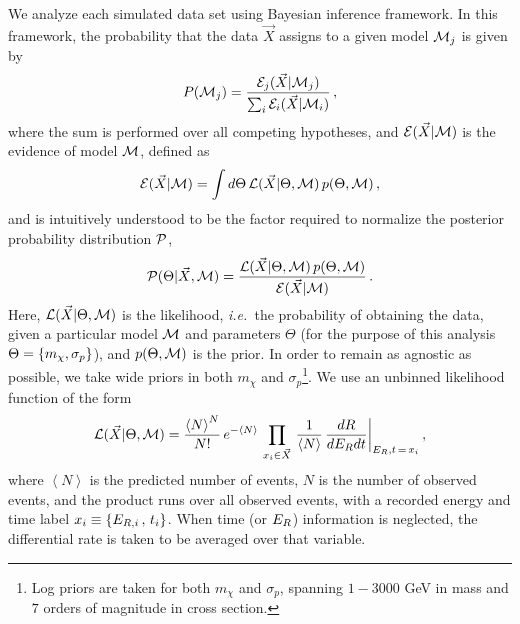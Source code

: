 \documentclass[11pt]{article}
\newcommand{\ie}{{\it i.e.~}}  \newcommand{\eg}{{\it e.g.~}}
\begin{document}
We analyze each simulated data set using Bayesian inference framework. In this framework, the probability that the data $\vec{X}$ assigns to a given model ${\cal M}_j$ is given by
\begin{equation}\label{eq:probs}
P({\cal M}_j) = \frac{{\cal E}_j(\vec{X}|{\cal M}_j)}{\sum_i {\cal E}_i(\vec{X}|{\cal M}_i)} \, ,
\end{equation}
where the sum is performed over all competing hypotheses, and ${\cal E}(\vec{X}|{\cal M})$ is the evidence of model ${\cal M}$, defined as
\begin{equation}\label{eq:evidence}
{\cal E}(\vec{X}|{\cal M}) = \int d\Theta \, {\cal L}(\vec{X}|\Theta,{\cal M}) \, p(\Theta,{\cal M}) \, ,
\end{equation}
and is intuitively understood to be the factor required to normalize the posterior probability distribution ${ \cal P}$,
\begin{equation}\label{eq:posterior}
{ \cal P}(\Theta | \vec{X}, {\cal M}) = \frac{{\cal L}(\vec{X}|\Theta,{\cal M})\, p(\Theta,{\cal M})}{{\cal E}(\vec{X}|{\cal M})} \, . 
\end{equation}
Here, ${\cal L}(\vec{X}|\Theta,{\cal M})$ is the likelihood, \ie the probability of obtaining the data, given a particular model ${\cal M}$ and parameters $\Theta$ (for the purpose of this analysis $\Theta = \left\{ m_\chi, \sigma_p \right\}$), and $p(\Theta, {\cal M})$ is the prior. In order to remain as agnostic as possible, we take wide priors in both $m_\chi$ and $\sigma_p$\footnote{Log priors are taken for both $m_\chi$ and $\sigma_p$, spanning $1-3000$ GeV in mass and $7$ orders of magnitude in cross section.}. We use an unbinned likelihood function of the form
\begin{equation}\label{eq:likelihood}
{\cal L}(\vec{X}|\Theta,{\cal M}) = \frac{\left<N \right>^N}{N!} \, e^{-\left<N \right>} \, \prod_{x_i \in \vec{X}}\, \frac{1}{\left<N \right>} \, \frac{dR}{dE_R dt} \bigg|_{E_R,t \, = \, x_i} \, ,
\end{equation}
where $\left<N \right>$ is the predicted number of events, $N$ is the number of observed events, and the product runs over all observed events, with a recorded energy and time label $x_i \equiv \left\{ E_{R,i} \, , \, t_i \right\}$. When time (or $E_R$) information is neglected, the differential rate is taken to be averaged over that variable. 
\end{document}
